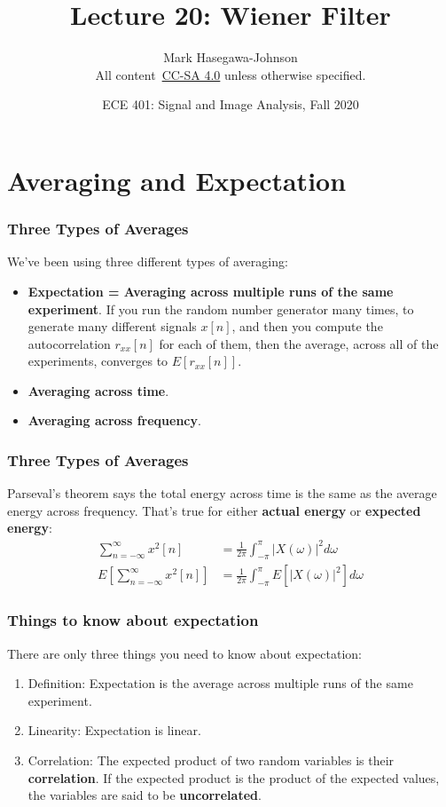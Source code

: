 \documentclass{beamer}
\title{Lecture 20: Wiener Filter}
\author{Mark Hasegawa-Johnson\\All content~\href{https://creativecommons.org/licenses/by-sa/4.0/}{CC-SA 4.0} unless otherwise specified.}
\date{ECE 401: Signal and Image Analysis, Fall 2020}
\begin{document}
\begin{frame}
  \maketitle
\end{frame}

\begin{frame}
  \tableofcontents
\end{frame}

\section[Expectation]{Averaging and Expectation}
\setcounter{subsection}{1}

\begin{frame}
  \frametitle{Three Types of Averages}

  We've been using three different types of averaging:
  \begin{itemize}
  \item {\bf Expectation = Averaging across multiple runs of the same
    experiment}.  If you run the random number generator many times,
    to generate many different signals $x[n]$, and then you compute
    the autocorrelation $r_{xx}[n]$ for each of them, then the
    average, across all of the experiments, converges to $E[r_{xx}[n]]$.
  \item {\bf Averaging across time}.  
  \item {\bf Averaging across frequency}. 
  \end{itemize}
\end{frame}
\begin{frame}
  \frametitle{Three Types of Averages}
  Parseval's theorem says the total energy across time is the same as
  the average energy across frequency.  That's true for either {\bf
    actual energy} or {\bf expected energy}:
  \begin{align*}
    \sum_{n=-\infty}^\infty x^2[n] &= \frac{1}{2\pi}\int_{-\pi}^\pi |X(\omega)|^2d\omega\\
    E\left[\sum_{n=-\infty}^\infty x^2[n]\right] &= \frac{1}{2\pi}\int_{-\pi}^\pi E\left[|X(\omega)|^2\right]d\omega
  \end{align*}
\end{frame}

\begin{frame}
  \frametitle{Things to know about expectation}

  There are only three things you need to know about expectation:
  \begin{enumerate}
  \item Definition: Expectation is the average across multiple runs of
    the same experiment.
  \item Linearity: Expectation is linear.
  \item Correlation: The expected product of two random variables is
    their {\bf correlation}.  If the expected product is the product of the
    expected values, the variables are said to be {\bf uncorrelated}.
  \end{enumerate}
\end{frame}
\end{document}
